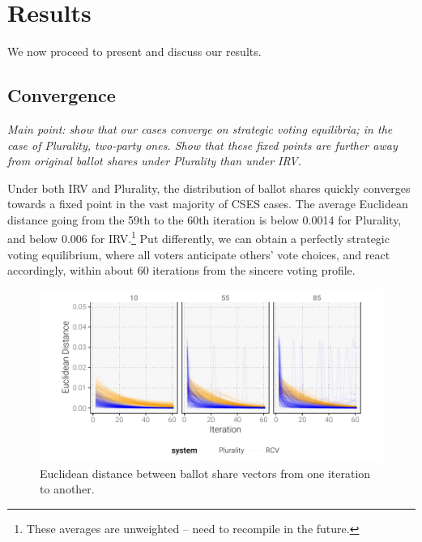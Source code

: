 \documentclass[12pt, letter]{article}
\begin{document}

\section{Results}

We now proceed to present and discuss our results.

\subsection{Convergence}

\textit{Main point: show that our cases converge on strategic voting equilibria; in the case of Plurality, two-party ones. Show that these fixed points are further away from original ballot shares under Plurality than under IRV.}

Under both IRV and Plurality, the distribution of ballot shares quickly converges towards a fixed point in the vast majority of CSES cases. The average Euclidean distance going from the 59th to the 60th iteration is below 0.0014 for Plurality, and below 0.006 for IRV.\footnote{These averages are unweighted -- need to recompile in the future.} Put differently, we can obtain a perfectly strategic voting equilibrium, where all voters anticipate others' vote choices, and react accordingly, within about 60 iterations from the sincere voting profile.

\begin{figure}[!tbh]
	\centering
	\includegraphics[width = \textwidth]{../output/figures/euclidean}
	\caption{Euclidean distance between ballot share vectors from one iteration to another.}
	\label{fig:convergence}
\end{figure}
\end{document}
